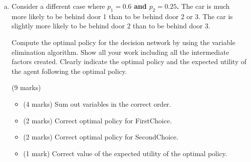 \documentclass[12pt]{article}
\begin{document}
\begin{enumerate}[(a)]
Compute the optimal policy for the decision network by applying the variable elimination algorithm. Show all your work including all the intermediate factors created. Clearly indicate the optimal policy and the expected utility of the agent following the optimal policy.

\begin{markscheme}

(9 marks)

\begin{itemize}
    \item (4 marks) Sum out variables in the correct order.
    \item (2 marks) Correct optimal policy for FirstChoice.
    \item (2 marks) Correct optimal policy for SecondChoice.
    \item (1 mark) Correct value of the expected utility of the optimal policy.
\end{itemize}    

\end{markscheme}
    
    
\item

Consider a different case where {\bf $p_1 = 0.6$ and $p_2 = 0.25$.}  The car is much more likely to be behind door 1 than to be behind door 2 or 3. The car is slightly more likely to be behind door 2 than to be behind door 3.

Compute the optimal policy for the decision network by using the variable elimination algorithm. Show all your work including all the intermediate factors created. Clearly indicate the optimal policy and the expected utility of the agent following the optimal policy.

\begin{markscheme}

(9 marks)

\begin{itemize}
\item (4 marks) Sum out variables in the correct order.
\item (2 marks) Correct optimal policy for FirstChoice.
\item (2 marks) Correct optimal policy for SecondChoice.
\item (1 mark) Correct value of the expected utility of the optimal policy.
\end{itemize}    

\end{markscheme}
    
      
\end{enumerate}
\end{document}
